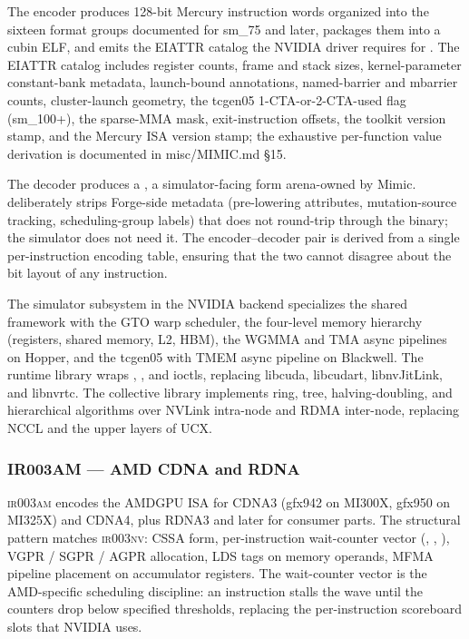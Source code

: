 The encoder produces 128-bit Mercury instruction words organized into the sixteen format groups documented for sm\_75 and later, packages them into a cubin ELF, and emits the EIATTR catalog the NVIDIA driver requires for .
The EIATTR catalog includes register counts, frame and stack sizes, kernel-parameter constant-bank metadata, launch-bound annotations, named-barrier and mbarrier counts, cluster-launch geometry, the tcgen05 1-CTA-or-2-CTA-used flag (sm\_100+), the sparse-MMA mask, exit-instruction offsets, the toolkit version stamp, and the Mercury ISA version stamp; the exhaustive per-function value derivation is documented in misc/MIMIC.md \S15.

The decoder produces a , a simulator-facing form arena-owned by Mimic.
 deliberately strips Forge-side metadata (pre-lowering attributes, mutation-source tracking, scheduling-group labels) that does not round-trip through the binary; the simulator does not need it.
The encoder--decoder pair is derived from a single per-instruction encoding table, ensuring that the two cannot disagree about the bit layout of any instruction.

The simulator subsystem in the NVIDIA backend specializes the shared framework with the GTO warp scheduler, the four-level memory hierarchy (registers, shared memory, L2, HBM), the WGMMA and TMA async pipelines on Hopper, and the tcgen05 with TMEM async pipeline on Blackwell.
The runtime library wraps , , and  ioctls, replacing libcuda, libcudart, libnvJitLink, and libnvrtc.
The collective library implements ring, tree, halving-doubling, and hierarchical algorithms over NVLink intra-node and RDMA inter-node, replacing NCCL and the upper layers of UCX.

\subsubsection{IR003AM --- AMD CDNA and RDNA}
\label{sec:ir003-am}

\textsc{ir003am} encodes the AMDGPU ISA for CDNA3 (gfx942 on MI300X, gfx950 on MI325X) and CDNA4, plus RDNA3 and later for consumer parts.
The structural pattern matches \textsc{ir003nv}: CSSA form, per-instruction wait-counter vector (, , ), VGPR / SGPR / AGPR allocation, LDS tags on memory operands, MFMA pipeline placement on  accumulator registers.
The wait-counter vector is the AMD-specific scheduling discipline: an  instruction stalls the wave until the counters drop below specified thresholds, replacing the per-instruction scoreboard slots that NVIDIA uses.

